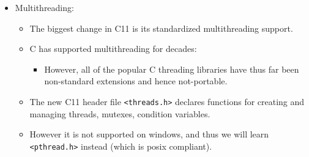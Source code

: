 \begin{itemize}
\begin{itemize}
            \item Multithreading:
                \begin{itemize}
                    \item The biggest change in C11 is its standardized multithreading support.
                    \item C has supported multithreading for decades:
                        \begin{itemize}
                            \item However, all of the popular C threading libraries have thus far been non-standard extensions and hence not-portable.
                        \end{itemize}
                    
                    \item The new C11 header file \texttt{<threads.h>} declares functions for creating and managing threads, mutexes, condition variables.
                    \item However it is not supported on windows, and thus we will learn \texttt{<pthread.h>} instead (which is posix compliant).
                \end{itemize}
        \end{itemize}
\end{itemize}
